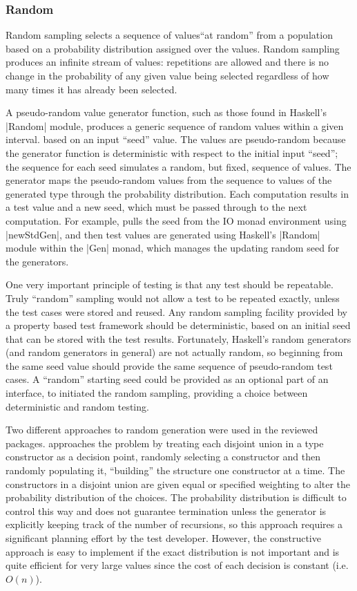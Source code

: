 \subsubsection{Random}

Random sampling selects a sequence of values``at random'' 
from a population based on a probability distribution assigned over the values.
Random sampling produces an infinite stream of values:
repetitions are allowed and 
there is no change in the probability of any given value being selected
regardless of how many times it has already been selected.

A pseudo-random value generator function,
such as those found in Haskell's  |Random| module,
produces a generic sequence of random values within a given interval.
based on an input ``seed'' value.
The values are pseudo-random because the generator function
is deterministic with respect to the initial input ``seed'';
the sequence for each seed simulates a random, but fixed, sequence of values.
The generator maps the pseudo-random values from the sequence
to values of the generated type through the probability distribution.
Each computation results in a test value and a new seed,
which must be passed through to the next computation.
For example, \QC pulls the seed from the IO monad environment using |newStdGen|,
and then test values are generated using Haskell's |Random| module within the |Gen| monad, 
which manages the updating random seed for the generators.

One very important principle of testing is that any test should be repeatable.
Truly ``random'' sampling would not allow a test to be repeated exactly,
unless the test cases were stored and reused.
Any random sampling facility provided by a property based test framework
should be deterministic, based on an initial seed that can be stored with the test results.
Fortunately, Haskell's random generators (and random generators in general) are not actually random,
so beginning from the same seed value should provide the same sequence of pseudo-random test cases.
A ``random'' starting seed could be provided as an optional part of an interface,
to initiated the random sampling,
providing a choice between deterministic and random testing.

Two different approaches to random generation were used in the reviewed packages.
\QC approaches the problem by treating 
each disjoint union in a type constructor as a decision point,
randomly selecting a constructor and then randomly populating it,
``building'' the structure one constructor at a time.
The constructors in a disjoint union are given equal or specified weighting
to alter the probability distribution of the choices.
The probability distribution is difficult to control this way
and does not guarantee termination unless
the generator is explicitly keeping track of the number of recursions,
so this approach requires a significant planning effort by the test developer.
However, the constructive approach is easy to implement if the exact distribution is not important and
is quite efficient for very large values since the cost of each decision is constant (i.e. $O(n)$).

